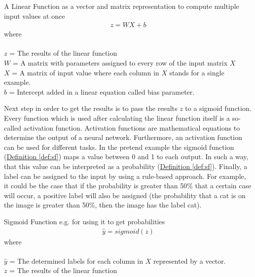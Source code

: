 \begin{definition}[label=lf]{A Linear Function as a vector and matrix representation to compute multiple input values at once}
	\begin{align*}
		z = W X + b
	\end{align*}
	where \\\\
	\(z\) = The results of the linear function\\
	\(W\) = A matrix with parameters assigned to every row of the input matrix \( X \)\\
	\(X\) = A matrix of input value where each column in \( X \) stands for a single example. \\
	\(b\) = Intercept added in a linear equation called bias parameter.\\
\end{definition}

Next step in order to get the results is to pass the results \( z \) to a sigmoid function. Every function which is used after calculating the linear function itself is a so-called activation function. Activation functions are mathematical equations to determine the output of a neural network. Furthermore, an activation function can be used for different tasks. In the pretend example the sigmoid function   (\hyperref[def:sf]{Definition \ref{def:sf}})  maps a value between 0 and 1 to each output. In such a way, that this value can be interpreted as a probability (\hyperref[def:sf]{Definition \ref{def:sf}}). Finally, a label can be assigned to the input by using a rule-based approach. For example, it could be the case that if the probability is greater than 50\% that a certain case will occur, a positive label will also be assigned (the probability that a cat is on the image is greater than 50\%, then the image has the label cat).\\

\begin{definition}[label=def:sf]{Sigmoid Function e.g. for using it to get probabilities}
	\begin{align*}
		\hat{y} = sigmoid(z)
	\end{align*}
	where \\\\
	\( \hat{y}\) = The determined labels for each column in \( X \) represented by a vector.\\
	\( z \)  = The results of the linear function\\
\end{definition}

